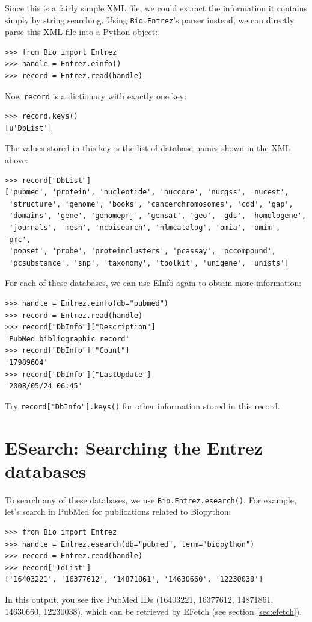 \documentclass{report}
\begin{document}
Since this is a fairly simple XML file, we could extract the information it contains simply by string searching. Using \verb+Bio.Entrez+'s parser instead, we can directly parse this XML file into a Python object:
\begin{verbatim}
>>> from Bio import Entrez
>>> handle = Entrez.einfo()
>>> record = Entrez.read(handle)
\end{verbatim}
Now \verb+record+ is a dictionary with exactly one key:
\begin{verbatim}
>>> record.keys()
[u'DbList']
\end{verbatim}
The values stored in this key is the list of database names shown in the XML above:
\begin{verbatim}
>>> record["DbList"]
['pubmed', 'protein', 'nucleotide', 'nuccore', 'nucgss', 'nucest',
 'structure', 'genome', 'books', 'cancerchromosomes', 'cdd', 'gap',
 'domains', 'gene', 'genomeprj', 'gensat', 'geo', 'gds', 'homologene',
 'journals', 'mesh', 'ncbisearch', 'nlmcatalog', 'omia', 'omim', 'pmc',
 'popset', 'probe', 'proteinclusters', 'pcassay', 'pccompound',
 'pcsubstance', 'snp', 'taxonomy', 'toolkit', 'unigene', 'unists']
\end{verbatim}

For each of these databases, we can use EInfo again to obtain more information:
\begin{verbatim}
>>> handle = Entrez.einfo(db="pubmed")
>>> record = Entrez.read(handle)
>>> record["DbInfo"]["Description"]
'PubMed bibliographic record'
>>> record["DbInfo"]["Count"]
'17989604'
>>> record["DbInfo"]["LastUpdate"]
'2008/05/24 06:45'
\end{verbatim}
Try \verb+record["DbInfo"].keys()+ for other information stored in this record.

\section{ESearch: Searching the Entrez databases}
To search any of these databases, we use \verb+Bio.Entrez.esearch()+. For example, let's search in PubMed for publications related to Biopython:
\begin{verbatim}
>>> from Bio import Entrez
>>> handle = Entrez.esearch(db="pubmed", term="biopython")
>>> record = Entrez.read(handle)
>>> record["IdList"]
['16403221', '16377612', '14871861', '14630660', '12230038']
\end{verbatim}
In this output, you see five PubMed IDs (16403221, 16377612, 14871861, 14630660, 12230038), which can be retrieved by EFetch (see section \ref{sec:efetch}).
\end{document}
